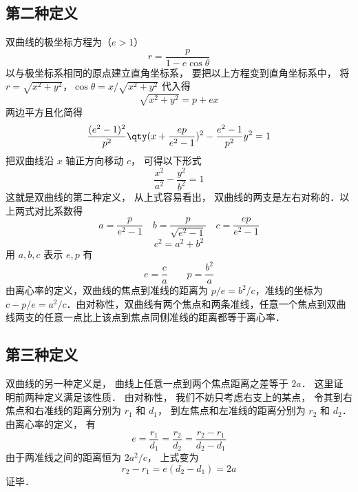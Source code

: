 

\subsection{第二种定义}

双曲线的极坐标方程为（$e>1$）
\begin{equation}
r = \frac{p}{{1 - e\cos \theta }}
\end{equation}
以与极坐标系相同的原点建立直角坐标系， 要把以上方程变到直角坐标系中， 将$r = \sqrt {{x^2} + {y^2}}$，$\cos \theta  = x/\sqrt{x^2 + y^2}$ 代入得
\begin{equation}
\sqrt {{x^2} + {y^2}}  = p + ex
\end{equation}
两边平方且化简得
\begin{equation}
\frac{(e^2 - 1)^2}{p^2} \qty(x + \frac{ep}{e^2 - 1} )^2 - \frac{e^2 - 1}{p^2}y^2 = 1
\end{equation}
把双曲线沿 $x$ 轴正方向移动 $c$， 可得以下形式
\begin{equation}\label{Hypb3_eq4}
\frac{{{x^2}}}{{{a^2}}} - \frac{{{y^2}}}{{{b^2}}} = 1
\end{equation}
这就是双曲线的第二种定义， 从上式容易看出， 双曲线的两支是左右对称的．以上两式对比系数得
\begin{equation}
a = \frac{p}{{{e^2} - 1}} \quad  b = \frac{p}{{\sqrt {{e^2} - 1} }} \quad c = \frac{{ep}}{{{e^2} - 1}}
\end{equation}
\begin{equation}
c^2 = a^2 + b^2
\end{equation}
用 $a, b, c$ 表示 $e,p$ 有
\begin{equation}
e = \frac{c}{a} \qquad p = \frac{{{b^2}}}{a}
\end{equation}
由离心率的定义，双曲线的焦点到准线的距离为 $p/e=b^2/c$，准线的坐标为 $c-p/e = a^2/c$．由对称性，双曲线有两个焦点和两条准线，任意一个焦点到双曲线两支的任意一点比上该点到焦点同侧准线的距离都等于离心率．

\subsection{第三种定义}
双曲线的另一种定义是， 曲线上任意一点到两个焦点距离之差等于 $2a$． 这里证明前两种定义满足该性质． 由对称性， 我们不妨只考虑右支上的某点， 令其到右焦点和右准线的距离分别为 $r_1$ 和 $d_1$， 到左焦点和左准线的距离分别为 $r_2$ 和 $d_2$． 由离心率的定义， 有
\begin{equation}
e = \frac{r_1}{d_1} = \frac{r_2}{d_2} = \frac{r_2 - r_1}{d_2 - d_1}
\end{equation}
由于两准线之间的距离恒为 $2a^2/c$， 上式变为
\begin{equation}
r_2 - r_1 = e(d_2 - d_1) = 2a
\end{equation}
证毕．

